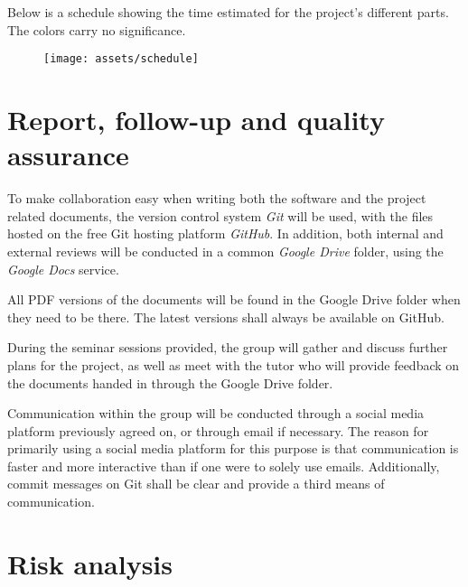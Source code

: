 \documentclass[12pt,titlepage]{article}
\begin{document}
Below is a schedule showing the time estimated for the project's different
parts. The colors carry no significance.

\begin{figure}[H]
	\centering
		\texttt{[image: assets/schedule]}
\end{figure}



\section{Report, follow-up and quality assurance}

To make collaboration easy when writing both the software and the project
related documents, the version control system \textit{Git} will be used, with
the files hosted on the free Git hosting platform \textit{GitHub}. In addition,
both internal and external reviews will be conducted in a common \textit{Google
Drive} folder, using the \textit{Google Docs} service.

All PDF versions of the documents will be found in the Google Drive folder when
they need to be there. The latest versions shall always be available on GitHub.

During the seminar sessions provided, the group will gather and discuss further
plans for the project, as well as meet with the tutor who will provide feedback
on the documents handed in through the Google Drive folder.

Communication within the group will be conducted through a social media platform
previously agreed on, or through email if necessary. The reason for primarily
using a social media platform for this purpose is that communication is faster
and more interactive than if one were to solely use emails. Additionally, commit
messages on Git shall be clear and provide a third means of communication.



\newpage
\appendix

\section{Risk analysis}
\label{app:risk-analysis}

\begin{usecase}
\end{usecase}
\end{document}
